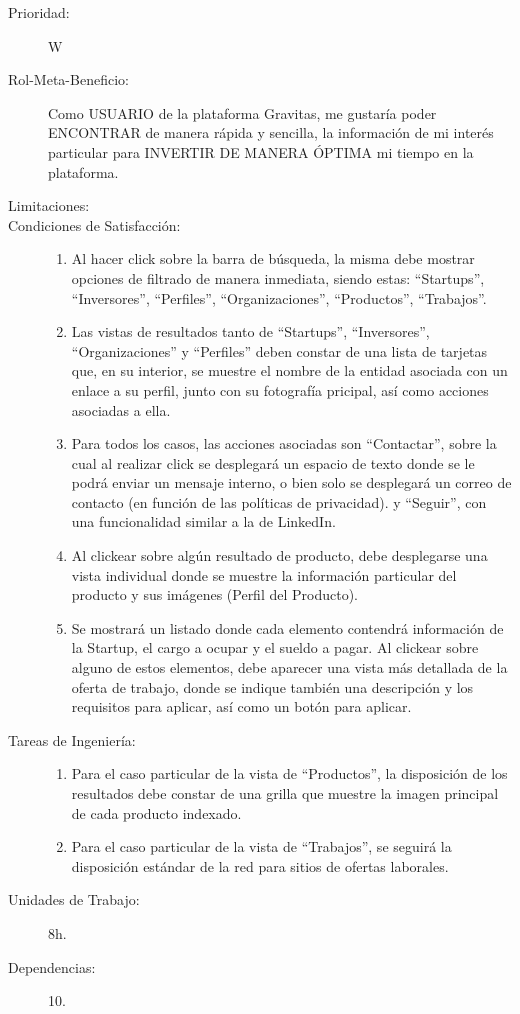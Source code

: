 \begin{description}
    \item[Prioridad:] W
    \item[Rol-Meta-Beneficio:] Como USUARIO de la plataforma Gravitas, me gustaría poder ENCONTRAR de manera rápida y sencilla, la información de mi interés particular para INVERTIR DE MANERA ÓPTIMA mi tiempo en la plataforma.
    \item[Limitaciones:] 
    \item[Condiciones de Satisfacción:]  \hfill
        \begin{enumerate}
            \item Al hacer click sobre la barra de búsqueda, la misma debe mostrar opciones de filtrado de manera inmediata, siendo estas: “Startups”, “Inversores”, “Perfiles”, “Organizaciones”, “Productos”, “Trabajos”.
    		\item Las vistas de resultados tanto de “Startups”, “Inversores”, “Organizaciones” y “Perfiles” deben constar de una lista de tarjetas que, en su interior, se muestre el nombre de la entidad asociada con un enlace a su perfil, junto con su fotografía pricipal, así como acciones asociadas a ella.
	    	\item Para todos los casos, las acciones asociadas son “Contactar”, sobre la cual al realizar click se desplegará un espacio de texto donde se le podrá enviar un mensaje interno, o bien solo se desplegará un correo de contacto (en función de las políticas de privacidad). y “Seguir”, con una funcionalidad similar a la de LinkedIn.
		    \item Al clickear sobre algún resultado de producto, debe     desplegarse una vista individual donde se muestre la información particular del producto y sus imágenes (Perfil del Producto).
		    \item Se mostrará un listado donde cada elemento contendrá información de la Startup, el cargo a ocupar y el sueldo a pagar. Al clickear sobre alguno de estos elementos, debe aparecer una vista más detallada de la oferta de trabajo, donde se indique también una descripción y los requisitos para aplicar, así como un botón para aplicar.
        \end{enumerate}
    \item[Tareas de Ingeniería:]  \hfill
        \begin{enumerate}
            \item Para el caso particular de la vista de “Productos”, la disposición de los resultados debe constar de una grilla que muestre la imagen principal de cada producto indexado.  
    		\item	Para el caso particular de la vista de “Trabajos”, se seguirá la disposición estándar de la red para sitios de ofertas laborales.
        \end{enumerate}
    \item[Unidades de Trabajo:] 8h.
    \item[Dependencias:] 10.
\end{description}

